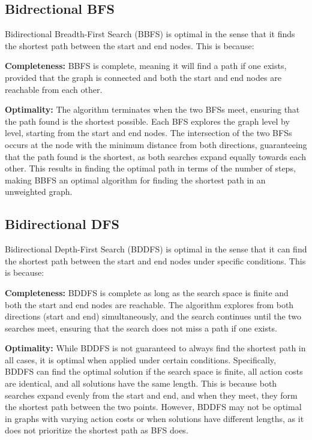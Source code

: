 \documentclass[final, journal, 11pt]{report}
\begin{document}
		\subsection*{Bidrectional BFS}
		Bidirectional Breadth-First Search (BBFS) is optimal in the sense that it finds the shortest path between the start and end nodes. This is because:
		
		\textbf{Completeness:} BBFS is complete, meaning it will find a path if one exists, provided that the graph is connected and both the start and end nodes are reachable from each other. 
		
		\textbf{Optimality:} The algorithm terminates when the two BFSs meet, ensuring that the path found is the shortest possible. Each BFS explores the graph level by level, starting from the start and end nodes. The intersection of the two BFSs occurs at the node with the minimum distance from both directions, guaranteeing that the path found is the shortest, as both searches expand equally towards each other. This results in finding the optimal path in terms of the number of steps, making BBFS an optimal algorithm for finding the shortest path in an unweighted graph.
		
		\subsection*{Bidirectional DFS}
		Bidirectional Depth-First Search (BDDFS) is optimal in the sense that it can find the shortest path between the start and end nodes under specific conditions. This is because:
		
		\textbf{Completeness:} BDDFS is complete as long as the search space is finite and both the start and end nodes are reachable. The algorithm explores from both directions (start and end) simultaneously, and the search continues until the two searches meet, ensuring that the search does not miss a path if one exists.
		
		\textbf{Optimality:} While BDDFS is not guaranteed to always find the shortest path in all cases, it is optimal when applied under certain conditions. Specifically, BDDFS can find the optimal solution if the search space is finite, all action costs are identical, and all solutions have the same length. This is because both searches expand evenly from the start and end, and when they meet, they form the shortest path between the two points. However, BDDFS may not be optimal in graphs with varying action costs or when solutions have different lengths, as it does not prioritize the shortest path as BFS does.
		
\end{document}
